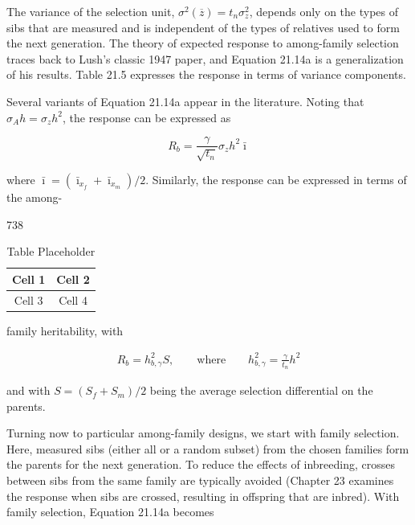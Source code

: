 \documentclass{article}
\begin{document}
The variance of the selection unit,  $ \sigma^2(\overline{z}) = t_n \sigma_z^2 $, depends only on the types of sibs that are measured and is independent of the types of relatives used to form the next generation. The theory of expected response to among-family selection traces back to Lush's classic 1947 paper, and Equation 21.14a is a generalization of his results. Table 21.5 expresses the response in terms of variance components.

Several variants of Equation 21.14a appear in the literature. Noting that  $ \sigma_{A}h = \sigma_{z}h^{2} $, the response can be expressed as

\begin{equation}
R_{b}=\frac{\gamma}{\sqrt{t_{n}}}\sigma_{z}h^{2}\bar{\imath}
\tag{21.15a}
\label{eq:21_15a}
\end{equation}

where  $ \bar{\imath} = (\bar{\imath}_{x_f} + \bar{\imath}_{x_m})/2 $. Similarly, the response can be expressed in terms of the among-

738

\begin{table}[h]
\centering
\begin{tabular}{|c|c|}
\hline
Cell 1 & Cell 2 \\
\hline
Cell 3 & Cell 4 \\
\hline
\end{tabular}
\caption{Table Placeholder}
\end{table}

family heritability, with

\begin{equation}
\begin{array}{r}{R_{b}=h_{b,\gamma}^{2}S,\qquad\mathrm{w h e r e}\qquad h_{b,\gamma}^{2}=\frac{\gamma}{t_{n}}h^{2}}\end{array}
\tag{21.15b}
\label{eq:21_15b}
\end{equation}

and with  $  S = (S_f + S_m) / 2  $ being the average selection differential on the parents.

Turning now to particular among-family designs, we start with family selection. Here, measured sibs (either all or a random subset) from the chosen families form the parents for the next generation. To reduce the effects of inbreeding, crosses between sibs from the same family are typically avoided (Chapter 23 examines the response when sibs are crossed, resulting in offspring that are inbred). With family selection, Equation 21.14a becomes
\end{document}
